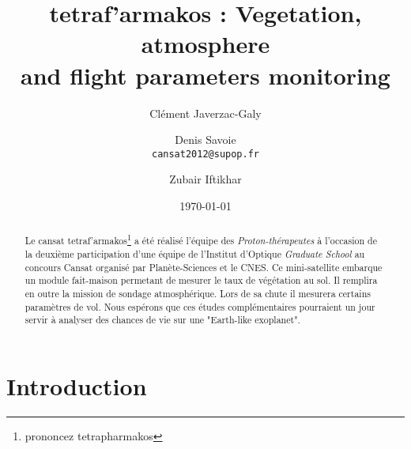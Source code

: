 \documentclass[twocolumn,10pt]{article}
\newcommand\tet{\textgreek{tetraf'armakos}}
\begin{document}
\title{\tet %
: Vegetation, atmosphere\\ and flight parameters monitoring} 
\author{Clément Javerzac-Galy \and{Denis Savoie}\\
\texttt{cansat2012@supop.fr}
\and{Zubair Iftikhar} \\
}
\date{\today}
\maketitle

 
\begin{abstract}
 \begin{bfseries}
	Le cansat \tet \footnote{prononcez tetrapharmakos} a été réalisé l'équipe des \textit{Proton-thérapeutes} à l'occasion de la deuxième participation d'une équipe de l'Institut d'Optique \textit{Graduate School} au concours Cansat organisé par Planète-Sciences et le CNES. Ce mini-satellite embarque un module fait-maison permetant de mesurer le taux de végétation au sol. Il remplira en outre la mission de sondage atmosphérique. Lors de sa chute il mesurera certains paramètres de vol. Nous espérons que ces études complémentaires pourraient un jour servir à analyser des chances de vie sur une "Earth-like exoplanet".
 \end{bfseries}
\end{abstract}

\section{Introduction}
	



\begin{thebibliography}{9}
\end{thebibliography}
\end{document}

